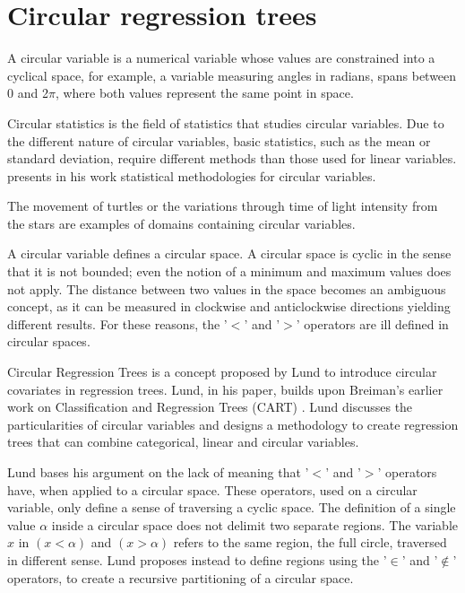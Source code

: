 \documentclass[times,twocolumn,final,authoryear]{elsarticle}
\begin{document}
\section{Circular regression trees}

A circular variable is a numerical variable whose values are constrained into a cyclical space, for example, a variable measuring angles in radians, spans between 0 and 2$ \pi $, where both values represent the same point in space. 

Circular statistics is the field of statistics that studies circular variables. Due to the different nature of circular variables, basic statistics, such as the mean or standard deviation, require different methods than those used for linear variables. \citep{Fisher1992} presents in his work statistical methodologies for circular variables. 

The movement of turtles \citep{Fisher1993} or the variations through time of light intensity from the stars \citep{Huerta1999} are examples of domains containing circular variables.

A circular variable defines a circular space. A circular space is cyclic in the sense that it is not bounded; even the notion of a minimum and maximum values does not apply. The distance between two values in the space becomes an ambiguous concept, as it can be measured in clockwise and anticlockwise directions yielding different results. For these reasons, the '$<$' and '$>$' operators are ill defined in circular spaces.

Circular Regression Trees is a concept proposed by Lund \citep{Lund2002} to introduce circular covariates in regression trees. Lund, in his paper, builds upon Breiman's earlier work on Classification and Regression Trees (CART) \citep{Breimanetal1984}. Lund discusses the particularities of circular variables and designs a methodology to create regression trees that can combine categorical, linear and circular variables.

Lund bases his argument on the lack of meaning that '$<$' and '$>$' operators have, when applied to a circular space. These operators, used on a circular variable, only define a sense of traversing a cyclic space. The definition of a single value $\alpha$ inside a circular space does not delimit two separate regions. The variable $x$ in $(x < \alpha)$ and $(x > \alpha)$ refers to the same region, the full circle, traversed in different sense. Lund proposes instead to define regions using the '$\in$' and '$\notin$' operators, to create a recursive partitioning of a circular space. 
\end{document}
